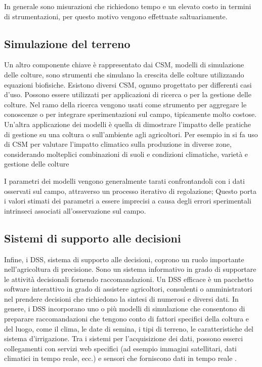 \documentclass[12pt,a4paper,openright,twoside, openany]{book}
\begin{document}
In generale sono misurazioni che richiedono tempo e un elevato costo in termini di strumentazioni, per questo motivo vengono effettuate saltuariamente.

\subsection{Simulazione del terreno}

Un altro componente chiave è rappresentato dai \ac{CSM}, modelli di simulazione delle colture, sono strumenti che simulano la crescita delle colture utilizzando equazioni biofisiche\cite{KELLY2023107986}.
Esistono diversi \ac{CSM}, ognuno progettato per differenti casi d'uso.
Possono essere utilizzati per applicazioni di ricerca o per la gestione delle colture. Nel ramo della ricerca vengono usati come strumento per aggregare le conoscenze o per integrare sperimentazioni sul campo, tipicamente molto costose. Un'altra applicazione dei modelli è quella di dimostrare l'impatto delle pratiche di gestione su una coltura o sull'ambiente agli agricoltori\cite{MATTHEWS201324}. Per esempio in \cite{Mereu2015} si fa uso di \ac{CSM} per valutare l'impatto climatico sulla produzione in diverse zone, considerando molteplici combinazioni di suoli e condizioni climatiche, varietà e gestione delle colture

I parametri dei modelli vengono generalmente tarati confrontandoli con i dati osservati sul campo, attraverso un processo iterativo di regolazione; Questo porta i valori stimati dei parametri a essere imprecisi a causa degli errori sperimentali intrinseci associati all'osservazione sul campo\cite{LI2012219}.

\subsection{Sistemi di supporto alle decisioni}

Infine, i \ac{DSS}, sistema di supporto alle decisioni, coprono un ruolo importante nell'agricoltura di precisione. Sono un sistema informativo in grado di supportare le attività decisionali fornendo raccomandazioni. Un \ac{DSS} efficace è un pacchetto software interattivo in grado di assistere agricoltori, consulenti o amministratori nel prendere decisioni che richiedono la sintesi di numerosi e diversi dati. In genere, i DSS incorporano uno o più modelli di simulazione che consentono di preparare raccomandazioni che tengono conto di fattori specifici della coltura e del luogo, come il clima, le date di semina, i tipi di terreno, le caratteristiche del sistema d'irrigazione. Tra i sistemi per l'acquisizione dei dati, possono esserci collegamenti con servizi web specifici (ad esempio immagini satellitari, dati climatici in tempo reale, ecc.) e sensori che forniscono dati in tempo reale \cite{GALLARDO2020106209}.
\newpage
\end{document}
